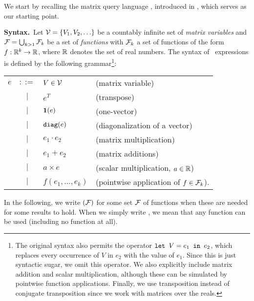 We start by recalling the matrix query language \lang, introduced in \cite{matlang}, which serves as our starting point.

\smallskip
\noindent
\textbf{Syntax.}\,  Let $\mathcal{V} = \{V_1, V_2, \ldots\}$ be a countably infinite set of \textit{matrix variables} and $\mathcal{F}=\bigcup_{k>1}\mathcal{F}_k$ be a set of \textit{functions} with
$\mathcal{F}_k$ a set of functions of the  form $f:\mathbb{R}^k \to \mathbb{R}$, where $\mathbb{R}$ denotes the set of real numbers. The syntax of \lang\ expressions is defined by the following grammar\footnote{The original syntax also permits the operator $\texttt{let } V = e_1 \texttt{ in } e_2$, which replaces every occurrence of $V$ in $e_2$ with the value of $e_1$. Since this is just syntactic sugar, we omit this operator. We also explicitly include matrix addition and scalar multiplication, although these can be simulated by pointwise function applications. Finally, we use transposition instead of conjugate transposition since we work with matrices over the reals.}:


\begin{tabular}{lcll}
$e$ & $::=$ & $V\in \mathcal{V}$ & (matrix variable)\\
 & $|$ & $e^T$ & (transpose)\\ 
 & $|$ & $\mathbf{1}(e)$ & (one-vector)\\ 
 & $|$ & $\texttt{diag}(e)$ & (diagonalization of a vector)\\  
 & $|$ & $e_1 \cdot e_2$ & (matrix multiplication)\\   
 & $|$ & $e_1 + e_2$ & (matrix additions)\\   
 & $|$ & $a\times e$ & (scalar multiplication, $a\in\mathbb{R}$)\\   
  & $|$ & $f(e_1,\ldots ,e_k)$ & (pointwise application of $f\in\mathcal{F}_k$).    
\end{tabular}

In the following, we write \lang$(\mathcal{F})$ for some set $\mathcal{F}$ of functions when
these are needed for some results to hold. When we simply write \lang, we
mean that any function can be used (including no function at all).

